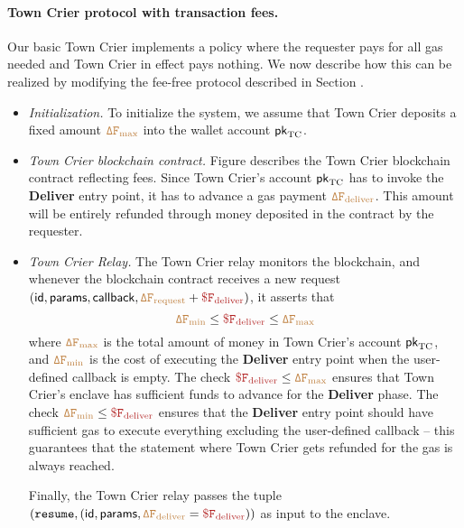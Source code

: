 \paragraph{Town Crier protocol with transaction fees.}
Our basic Town Crier implements a policy where the requester pays for all gas 
needed and Town Crier in effect pays nothing.
We now describe how this can be realized by modifying
the fee-free protocol described in Section . 

\begin{itemize}[leftmargin=5mm]
\item
{\it Initialization.}
To initialize the system, we assume that Town Crier 
deposits a fixed amount $\tt {\color{brown} \Delta F_{\text{max}} }$ 
into the wallet account ${\sf pk}_{\textrm{TC}}$.
\item
{\it Town Crier blockchain contract.}
Figure  describes the  
Town Crier blockchain contract reflecting fees.
Since Town Crier's account 
${\sf pk}_{\textrm{TC}}$ has to invoke the {\bf Deliver} entry point, it has
to advance 
a gas payment 
$\tt {\color{brown} \Delta F_{\text{deliver}} }$.
This amount will be entirely refunded through money deposited in the contract 
by the requester.
\item
{\it Town Crier Relay.}
The Town Crier relay monitors
the blockchain, and whenever
the blockchain contract \tcont
receives a new request $({\sf id}, {\sf params}, {\sf callback}, 
\sbrown{\Delta F_{\text{request}}}+\smaroon{\$ F_{\text{deliver}}})$,
it asserts that 
\[
\sbrown{\Delta F_{\text{min}}}
\leq \smaroon{\$ F_{\text{deliver}}} \leq \sbrown{\Delta F_{\text{max}}}
\]
where $\tt {\color{brown} \Delta F_{\text{max}} }$ is the total amount of money
in Town Crier's account ${\sf pk}_{\textrm{TC}}$, 
and $\tt {\color{brown} \Delta F_{\text{min}} }$
is the cost of executing the {\bf Deliver} entry point 
when the user-defined callback is empty.
The check 
$\smaroon{\$ F_{\text{deliver}}} \leq \sbrown{\Delta F_{\text{max}}}$
ensures that Town Crier's enclave  
has sufficient funds to advance
for the {\bf Deliver} phase.
The check 
$\sbrown{\Delta F_{\text{min}}}
\leq \smaroon{\$ F_{\text{deliver}}}$
ensures that 
the {\bf Deliver} entry point should 
have sufficient gas to execute everything excluding the user-defined
callback -- this guarantees that the statement
where Town Crier gets refunded for the gas is always reached.


Finally, the Town Crier relay passes
the tuple $({\tt resume}, 
({\sf id}, {\sf params}, 
\sbrown{\Delta F_{\text{deliver}}}
= \smaroon{\$ F_{\text{deliver}}}
))$
as input to the enclave.



\end{itemize}
